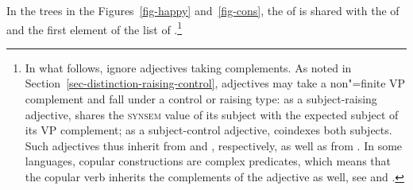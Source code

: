 In the trees in the Figures~\ref{fig-happy} and~\ref{fig-cons}, the \subjf of  is
shared with the \subjf of  and the first element of the \comps list of
.\footnote{In what follows,  ignore adjectives taking complements. As noted in Section~\ref{sec-distinction-raising-control}, adjectives may take a non"=finite VP complement and fall under a control or raising type: as a subject-raising adjective,  shares the \textsc{synsem} value of its subject with the expected subject of its VP complement; as a subject-control adjective,  coindexes both subjects.
Such adjectives thus inherit from  and ,
respectively, as well as from . In some languages, copular constructions are
complex predicates, which means that the copular verb inherits the complements of the adjective as
well, see  and .}


